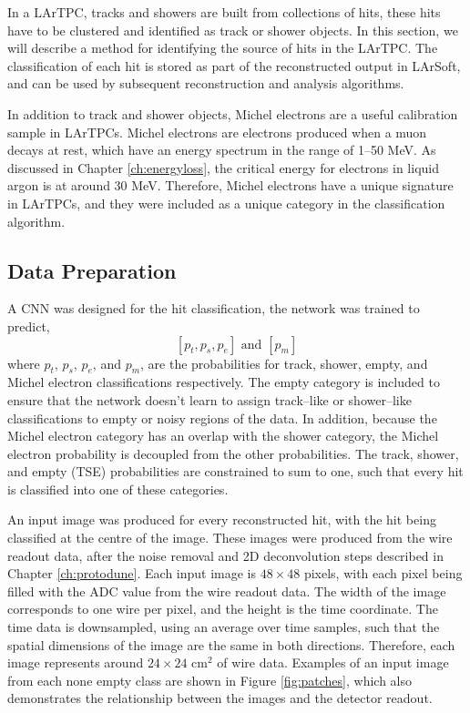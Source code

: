 In a LArTPC, tracks and showers are built from collections of hits, these hits
have to be clustered and identified as track or shower objects. In this section,
we will describe a method for identifying the source of hits in the \protodune{}
LArTPC. The classification of each hit is stored as part of the reconstructed
output in LArSoft, and can be used by subsequent reconstruction and analysis
algorithms.

In addition to track and shower objects, Michel electrons are a useful 
calibration sample in LArTPCs. Michel electrons are electrons produced when a 
muon decays at rest, which have an energy spectrum in the range of 1--50 MeV. 
As discussed in Chapter \ref{ch:energyloss}, the critical energy for electrons 
in liquid argon is at around 30 MeV. Therefore, Michel electrons have a unique 
signature in LArTPCs, and they were included as a unique category in the 
classification algorithm.

\subsection{Data Preparation}

A CNN was designed for the hit classification, the network was trained to
predict,
\begin{equation*}
	\left[ p_t, p_s, p_e \right] \mbox{ and } \left[ p_m \right]
\end{equation*}
where $p_t$, $p_s$, $p_e$, and $p_m$, are the probabilities for track, shower,
empty, and Michel electron classifications respectively. The empty category is
included to ensure that the network doesn't learn to assign track--like or
shower--like classifications to empty or noisy regions of the data. In addition,
because the Michel electron category has an overlap with the shower category, 
the Michel electron probability is decoupled from the other probabilities. The 
track, shower, and empty (TSE) probabilities are constrained to sum to one, 
such that every hit is classified into one of these categories.

An input image was produced for every reconstructed hit, with the hit being
classified at the centre of the image. These images were produced from the 
wire readout data, after the noise removal and 2D deconvolution steps 
described in Chapter \ref{ch:protodune}. Each input image is $48 \times 48$
pixels, with each pixel being filled with the ADC value from the wire readout
data.  The width of the image corresponds to one wire per pixel, and 
the height is the time coordinate. The time data is downsampled, using an 
average over time samples, such that the spatial dimensions of the image are 
the same in both directions. Therefore, each image represents around $24 
\times 24 \mbox{ cm}^2$ of wire data. Examples of an input image from each 
none empty class are shown in Figure \ref{fig:patches}, which also 
demonstrates the relationship between the images and the detector readout.

